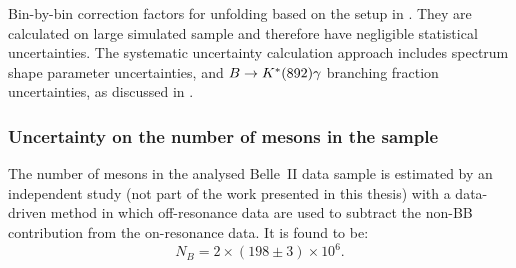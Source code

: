 \begin{table}[htbp!]
    \centering
    
    \caption{\label{tab:unfolding_uncertainties} Bin-by-bin correction factors for unfolding based on the setup in . 
    They are calculated on large simulated sample and therefore have negligible statistical uncertainties.
    The systematic uncertainty calculation approach includes \EB spectrum shape parameter uncertainties, 
    \BtoXsgamma and $B\rightarrow K^*(892)\gamma$ branching fraction uncertainties, as discussed in  .
    }

    
\end{table}

\subsubsection{Uncertainty on the number of \texorpdfstring{\B}{B} mesons in the sample}\label{sec:b_meson_uncertainty}

The number of \B mesons in the analysed Belle~II data sample is estimated by an independent study (not part of the work presented in this thesis)
with a data-driven method in which off-resonance data are used to subtract the non-BB contribution from the on-resonance data.
It is found to be:
\begin{equation}\label{eq:b_meson_count}
    N_B = 2\times(198\pm3)\times10^6.
\end{equation}
